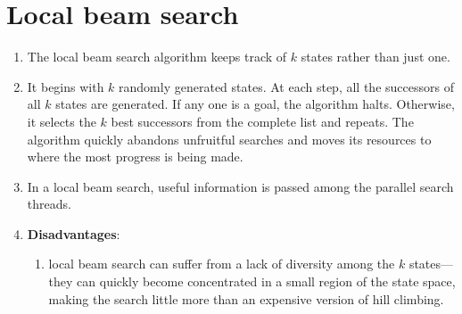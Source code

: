 \section{Local beam search \cite{ai/book/Artificial-Intelligence-A-Modern-Approach/Russell-Norvig}}
\label{AI: Algorithms/Local beam search}


\begin{enumerate}
    \item The local beam search algorithm keeps track of $k$ states rather than just one.
    \hfill \cite{ai/book/Artificial-Intelligence-A-Modern-Approach/Russell-Norvig}

    \item It begins with $k$ randomly generated states.
    At each step, all the successors of all $k$ states are generated.
    If any one is a goal, the algorithm halts.
    Otherwise, it selects the $k$ best successors from the complete list and repeats.
    The algorithm quickly abandons unfruitful searches and moves its resources to where the most progress is being made.
    \hfill \cite{ai/book/Artificial-Intelligence-A-Modern-Approach/Russell-Norvig}

    \item In a local beam search, useful information is passed among the parallel search threads.
    \hfill \cite{ai/book/Artificial-Intelligence-A-Modern-Approach/Russell-Norvig}

    \item \textbf{Disadvantages}:
    \begin{enumerate}
        \item local beam search can suffer from a lack of diversity among the $k$ states—they can quickly become concentrated in a small region of the state space, making the search little more than an expensive version of hill climbing.
        \hfill \cite{ai/book/Artificial-Intelligence-A-Modern-Approach/Russell-Norvig}
    \end{enumerate}
\end{enumerate}




















